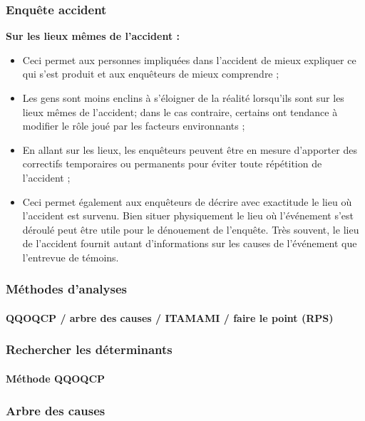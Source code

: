 \documentclass{beamer}
\begin{document}
\begin{frame}
\frametitle{Enquête accident}

\textbf{Sur les lieux mêmes de l’accident : }
\begin{itemize}
\item Ceci permet aux personnes impliquées dans l’accident de mieux expliquer ce qui s’est produit et aux enquêteurs de mieux comprendre ;

\item Les gens sont moins enclins à s’éloigner de la réalité lorsqu’ils sont sur les lieux mêmes de l’accident; dans le cas contraire, certains ont tendance à modifier le rôle joué par les facteurs environnants ;

\item En allant sur les lieux, les enquêteurs peuvent être en mesure d’apporter des correctifs temporaires ou permanents pour éviter toute répétition de l’accident ;

\item Ceci permet également aux enquêteurs de décrire avec exactitude le lieu où l’accident est survenu. Bien situer physiquement le lieu où l’événement s’est déroulé peut être utile pour le dénouement de l’enquête. Très souvent, le lieu de l’accident fournit autant d’informations sur les causes de l’événement que l’entrevue de témoins.
\end{itemize} 
\end{frame}

\begin{frame}
\frametitle{Méthodes d’analyses}
\framesubtitle{QQOQCP / arbre des causes / ITAMAMI / faire le point (RPS)}
\end{frame}

\begin{frame}
\frametitle{Rechercher les déterminants}
\framesubtitle{Méthode QQOQCP}

\end{frame}

\begin{frame}
\frametitle{Arbre des causes}

\end{frame}
\end{document}
